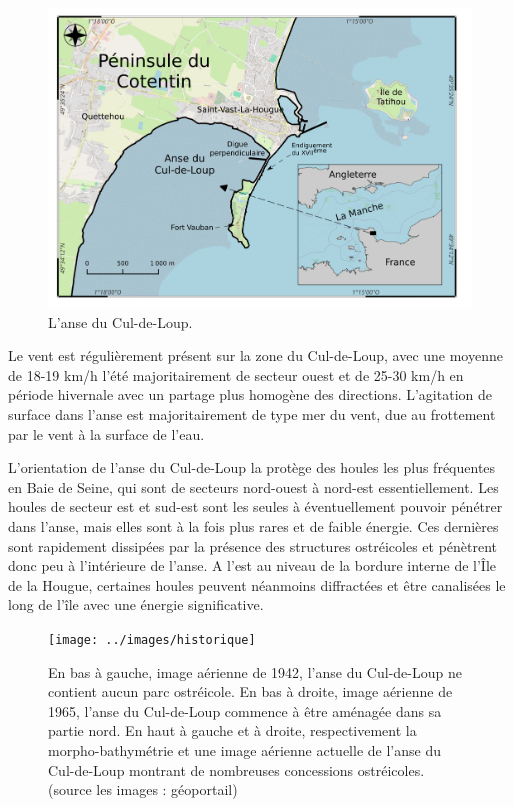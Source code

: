\documentclass[10pt,a4paper,titlepage]{article}
\begin{document}
    \begin{figure}[!h]
        \centering
        \includegraphics[width=0.8\linewidth]{../images/carte-ADCL}
        \caption[anse du Cul-de-Loup.]{L'anse du Cul-de-Loup.}
        \label{fig:carte-adcl}
    \end{figure}

    Le vent est régulièrement présent sur la zone du Cul-de-Loup, avec une moyenne de 18-19 km/h l'été majoritairement de secteur ouest et de 25-30 km/h en période hivernale avec un partage plus homogène des directions. L'agitation de surface dans l'anse est majoritairement de type mer du vent, due au frottement par le vent à la surface de l'eau.

    L'orientation de l'anse du Cul-de-Loup la protège des houles les plus fréquentes en Baie de Seine, qui sont de secteurs nord-ouest à nord-est essentiellement. Les houles de secteur est et sud-est sont les seules à éventuellement pouvoir pénétrer dans l'anse, mais elles sont à la fois plus rares et de faible énergie. Ces dernières sont rapidement dissipées par la présence des structures ostréicoles et pénètrent donc peu à l'intérieure de l'anse. A l'est au niveau de la bordure interne de l'Île de la Hougue, certaines houles peuvent néanmoins diffractées et être canalisées le long de l'île avec une énergie significative.

    \begin{figure}[!h]
        \centering
        \texttt{[image: ../images/historique]}
        \caption[Évolution de l'anse du Cul-de-Loup]{En bas à gauche, image aérienne de 1942, l'anse du Cul-de-Loup ne contient aucun parc ostréicole. En bas à droite, image aérienne de 1965, l'anse du Cul-de-Loup commence à être aménagée dans sa partie nord. En haut à gauche et à droite, respectivement la morpho-bathymétrie  et une image aérienne actuelle de l'anse du Cul-de-Loup montrant de nombreuses concessions ostréicoles. (source les images : géoportail)}
        \label{fig:historique-adcl}
    \end{figure}
\end{document}
